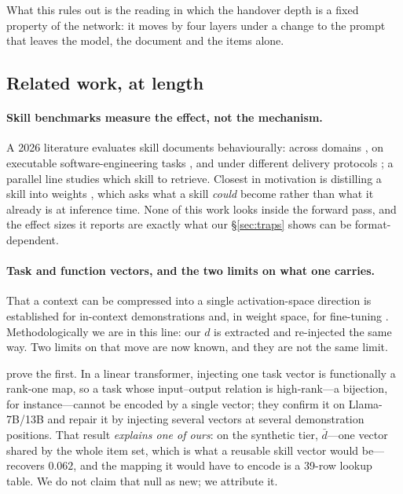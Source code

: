 \documentclass{article}
\newcommand{\dvec}{\ensuremath{d}}
\begin{document}
What this rules out is the reading in which the handover depth is a fixed
property of the network: it moves by four layers under a change to the prompt
that leaves the model, the document and the items alone.


\subsection{Related work, at length}
\label{app:related}

\paragraph{Skill benchmarks measure the effect, not the mechanism.}
A 2026 literature evaluates skill documents behaviourally: across domains
\citep{skillsbench2026}, on executable software-engineering tasks
\citep{sweskills2026}, and under different delivery protocols
\citep{skillsinjector2026}; a parallel line studies which skill to retrieve.
Closest in motivation is distilling a skill into weights
\citep{skilltolora2026}, which asks what a skill \emph{could} become rather
than what it already is at inference time. None of this work looks inside the
forward pass, and the effect sizes it reports are exactly what our
\S\ref{sec:traps} shows can be format-dependent.

\paragraph{Task and function vectors, and the two limits on what one carries.}
That a context can be compressed into a single activation-space direction is
established for in-context demonstrations \citep{hendel2023taskvectors,
todd2024functionvectors} and, in weight space, for fine-tuning
\citep{ilharco2023taskarithmetic}. Methodologically we are in this line: our
$\dvec$ is extracted and re-injected the same way. Two limits on that move are
now known, and they are not the same limit.

\citet{dong2026taskvectorlimits} prove the first. In a linear transformer,
injecting one task vector is functionally a rank-one map, so a task whose
input--output relation is high-rank---a bijection, for instance---cannot be
encoded by a single vector; they confirm it on Llama-7B/13B and repair it by
injecting several vectors at several demonstration positions. That result
\emph{explains one of ours}: on the synthetic tier, $\bar{\dvec}$---one vector
shared by the whole item set, which is what a reusable skill vector would
be---recovers $0.062$, and the mapping it would have to encode is a 39-row
lookup table. We do not claim that null as new; we attribute it.
\end{document}
